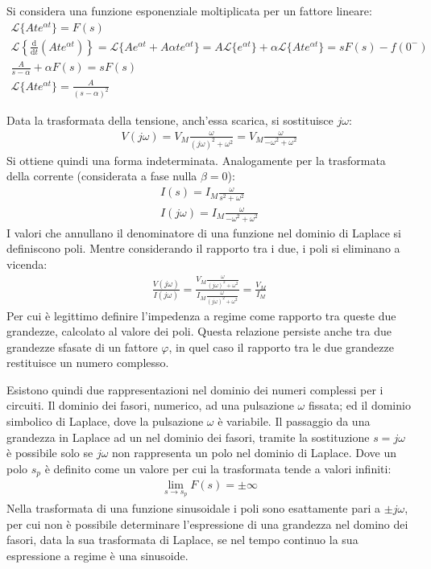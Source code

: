 \documentclass{article}
\newcommand{\df}{\mathrm{d}}
\numberwithin{equation}{subsection}
\begin{document}
Si considera una funzione esponenziale moltiplicata per un fattore lineare:
\begin{gather*}
    \mathcal{L}\{Ate^{\alpha t}\}=F(s)\\
    \mathcal{L}\left\{\displaystyle\frac{\df}{\df t}\left(Ate^{\alpha t}\right)\right\}=\mathcal{L}\{Ae^{\alpha t}+A\alpha te^{\alpha t}\}=A\mathcal{L}\{e^{\alpha t}\}+\alpha\mathcal{L}\{Ate^{\alpha t}\}=sF(s)-f(0^-)\\
    \displaystyle\frac{A}{s-\alpha}+\alpha F(s)=sF(s)\\
    \mathcal{L}\{Ate^{\alpha t}\}=\frac{A}{(s-\alpha)^2}
\end{gather*}

Data la trasformata della tensione, anch'essa scarica, si sostituisce $j\omega$:
\begin{gather*}
    V(j\omega)=V_M\displaystyle\frac{\omega}{(j\omega)^2+\omega^2}=V_M\frac{\omega}{-\omega^2+\omega^2}
\end{gather*}
Si ottiene quindi una forma indeterminata. Analogamente per la trasformata della corrente (considerata a fase nulla $\beta=0$): 
\begin{gather*}
    I(s)=\displaystyle I_M\frac{\omega}{s^2+\omega^2}\\
    I(j\omega)=\displaystyle {I_M}\frac{\omega}{-\omega^2+\omega^2}
\end{gather*}
I valori che annullano il denominatore di una funzione nel dominio di Laplace si definiscono poli. Mentre considerando il rapporto tra i due, i poli si eliminano a vicenda:
\begin{gather*}
    \displaystyle\frac{V(j\omega)}{I(j\omega)}=\displaystyle\frac{V_M\displaystyle\frac{\omega}{(j\omega)^2+\omega^2}}{I_M\displaystyle\frac{\omega}{(j\omega)^2+\omega^2}}=\frac{V_M}{I_M}
\end{gather*}
Per cui è legittimo definire l'impedenza a regime come rapporto tra queste due grandezze, calcolato al valore dei poli. Questa relazione persiste anche tra due grandezze 
sfasate di un fattore $\varphi$, in quel caso il rapporto tra le due grandezze restituisce un numero complesso. 


Esistono quindi due rappresentazioni nel dominio dei numeri complessi per i circuiti. Il dominio dei fasori, numerico, ad una pulsazione $\omega$ fissata; ed il dominio 
simbolico di Laplace, dove la pulsazione $\omega$ è variabile. Il passaggio da una grandezza in Laplace ad un nel dominio dei fasori, tramite la sostituzione $s=j\omega$ è 
possibile solo se $j\omega$ non rappresenta un polo nel dominio di Laplace. Dove un polo $s_p$ è definito come un valore per cui la trasformata tende a valori infiniti:
\begin{gather*}
    \lim_{s\to s_p}F(s)=\pm\infty
\end{gather*}
Nella trasformata di una funzione sinusoidale i poli sono esattamente pari a $\pm j\omega$, per cui non è possibile determinare l'espressione di una grandezza nel domino 
dei fasori, data la sua trasformata di Laplace, se nel tempo continuo la sua espressione a regime è una sinusoide. 
\end{document}
